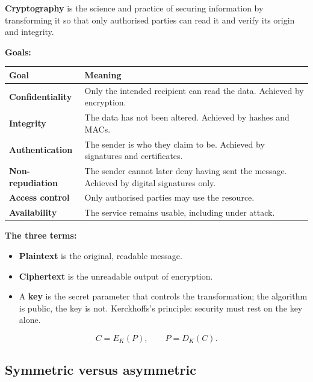 \documentclass[11pt,a4paper]{article}
\begin{document}
\begin{solbox}
\textbf{Cryptography} is the science and practice of securing information by transforming it so that only authorised parties can read it and verify its origin and integrity.

\textbf{Goals:}
\begin{center}\small
\begin{tabularx}{\textwidth}{>{\bfseries}p{} X}
\toprule Goal & Meaning\\
\midrule
Confidentiality & Only the intended recipient can read the data. Achieved by encryption.\\
Integrity & The data has not been altered. Achieved by hashes and MACs.\\
Authentication & The sender is who they claim to be. Achieved by signatures and certificates.\\
Non-repudiation & The sender cannot later deny having sent the message. Achieved by digital signatures only.\\
Access control & Only authorised parties may use the resource.\\
Availability & The service remains usable, including under attack.\\
\bottomrule
\end{tabularx}
\end{center}

\textbf{The three terms:}
\begin{itemize}
\item \textbf{Plaintext} is the original, readable message.
\item \textbf{Ciphertext} is the unreadable output of encryption.
\item A \textbf{key} is the secret parameter that controls the transformation; the algorithm is public, the key is not. Kerckhoffs's principle: security must rest on the key alone.
\end{itemize}

\[
C = E_K(P), \qquad P = D_K(C).
\]
\end{solbox}

\subsection{Symmetric versus asymmetric}
\end{document}
